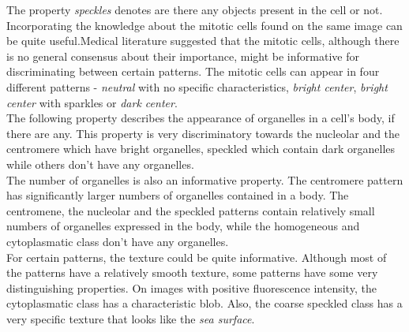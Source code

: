 The property \textit{speckles} denotes are there any objects present in the cell or not. \\

Incorporating the knowledge about the mitotic cells found on the same image can be quite useful.Medical literature suggested that the mitotic cells, although there is no general consensus about their importance, might be informative for discriminating between certain patterns. The mitotic cells can appear in four different patterns - \textit{neutral} with no specific characteristics, \textit{bright center},  \textit{bright center} with sparkles or \textit{dark center}. \\

The following property describes the appearance of organelles in a cell's body, if there are any. This property is very discriminatory towards the nucleolar and the centromere which have bright organelles, speckled which contain dark organelles while others don't have any organelles. \\

The number of organelles is also an informative property. The centromere pattern has significantly larger numbers of organelles contained in a body. The centromene, the nucleolar and the speckled patterns contain relatively small numbers of organelles expressed in the body, while the homogeneous and cytoplasmatic class don't have any organelles. \\

For certain patterns, the texture could be quite informative. Although most of the patterns have a relatively smooth texture, some patterns have some very distinguishing properties. On images with positive fluorescence intensity, the cytoplasmatic class has a characteristic blob. Also, the coarse speckled class has a very specific texture that looks like the \textit{sea surface}. \\



